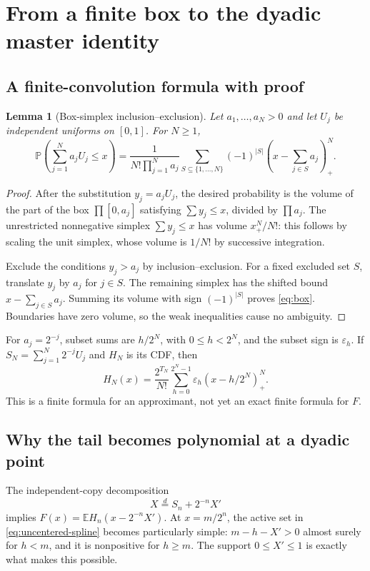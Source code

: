 \documentclass[11pt,a4paper]{article}
\numberwithin{equation}{section}
\newtheorem{lemma}[theorem]{Lemma}
\theoremstyle{definition}
\theoremstyle{remark}
\newcommand{\E}{\mathbb E}
\newcommand{\Pp}{\mathbb P}
\newcommand{\eps}{\varepsilon}
\newcommand{\pos}[1]{\left(#1\right)_+}
\begin{document}
\section{From a finite box to the dyadic master identity}
\label{sec:master}

\subsection{A finite-convolution formula with proof}
\begin{lemma}[Box-simplex inclusion--exclusion]
\label{lem:box}
Let $a_1,\ldots,a_N>0$ and let $U_j$ be independent uniforms on $[0,1]$. For $N\ge1$,
\begin{equation}
 \Pp\left(\sum_{j=1}^N a_jU_j\le x\right)
 =\frac1{N!\prod_{j=1}^N a_j}
 \sum_{S\subseteq\{1,\ldots,N\}}(-1)^{|S|}
 \pos{x-\sum_{j\in S}a_j}^{N}.
 \label{eq:box}
\end{equation}
\end{lemma}
\begin{proof}
After the substitution $y_j=a_jU_j$, the desired probability is the volume of the part of the box $\prod[0,a_j]$ satisfying $\sum y_j\le x$, divided by $\prod a_j$. The unrestricted nonnegative simplex $\sum y_j\le x$ has volume $x_+^N/N!$: this follows by scaling the unit simplex, whose volume is $1/N!$ by successive integration.

Exclude the conditions $y_j>a_j$ by inclusion--exclusion. For a fixed excluded set $S$, translate $y_j$ by $a_j$ for $j\in S$. The remaining simplex has the shifted bound $x-\sum_{j\in S}a_j$. Summing its volume with sign $(-1)^{|S|}$ proves \cref{eq:box}. Boundaries have zero volume, so the weak inequalities cause no ambiguity.
\end{proof}

For $a_j=2^{-j}$, subset sums are $h/2^N$, with $0\le h<2^N$, and the subset sign is $\eps_h$. If $S_N=\sum_{j=1}^N2^{-j}U_j$ and $H_N$ is its CDF, then
\begin{equation}
 H_N(x)=\frac{2^{T_N}}{N!}\sum_{h=0}^{2^N-1}\eps_h\pos{x-h/2^N}^{N}.
 \label{eq:uncentered-spline}
\end{equation}
This is a finite formula for an approximant, not yet an exact finite formula for $F$.

\subsection{Why the tail becomes polynomial at a dyadic point}
The independent-copy decomposition
\[
 X\overset d=S_n+2^{-n}X'
\]
implies $F(x)=\E H_n(x-2^{-n}X')$. At $x=m/2^n$, the active set in \cref{eq:uncentered-spline} becomes particularly simple: $m-h-X'>0$ almost surely for $h<m$, and it is nonpositive for $h\ge m$. The support $0\le X'\le1$ is exactly what makes this possible.
\end{document}
